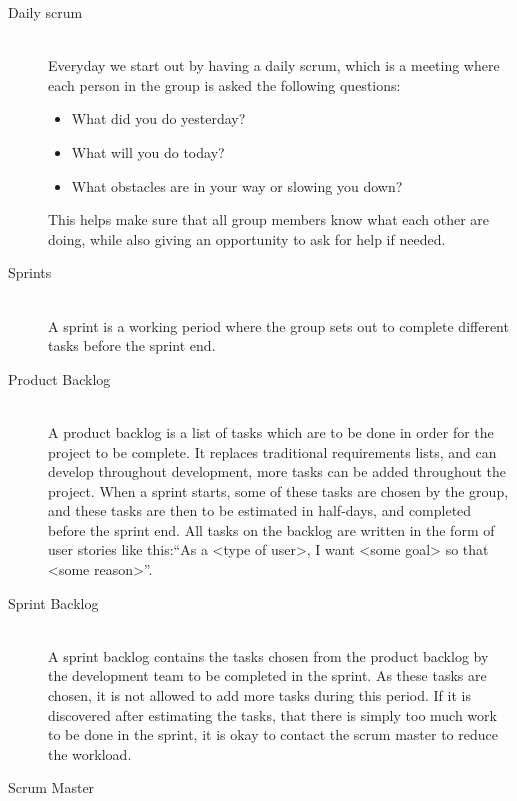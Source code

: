 \begin{description}
	\item[Daily scrum] \hfill \\
	Everyday we start out by having a daily scrum, which is a meeting where each person in the group is asked the following questions:
		\begin{itemize}
		    \item What did you do yesterday? 
			\item What will you do today?
			\item What obstacles are in your way or slowing you down?		
		\end{itemize}
		This helps make sure that all group members know what each other are doing, while also giving an opportunity to ask for help if needed.
	\item[Sprints] \hfill \\
	A sprint is a working period where the group sets out to complete different tasks before the sprint end. 
	\item[Product Backlog] \hfill \\
	A product backlog is a list of tasks which are to be done in order for the project to be complete. 
	It replaces traditional requirements lists, and can develop throughout development, more tasks can be added throughout the project.
	When a sprint starts, some of these tasks are chosen by the group, and these tasks are then to be estimated in half-days, and completed before the sprint end.
	All tasks on the backlog are written in the form of user stories like this:``As a <type of user>, I want <some goal> so that <some reason>''.
	\item[Sprint Backlog] \hfill \\
	A sprint backlog contains the tasks chosen from the product backlog by the development team to be completed in the sprint.
	As these tasks are chosen, it is not allowed to add more tasks during this period.
	If it is discovered after estimating the tasks, that there is simply too much work to be done in the sprint, it is okay to contact the scrum master to reduce the workload.
	\item[Scrum Master] \hfill \\

\end{description}
